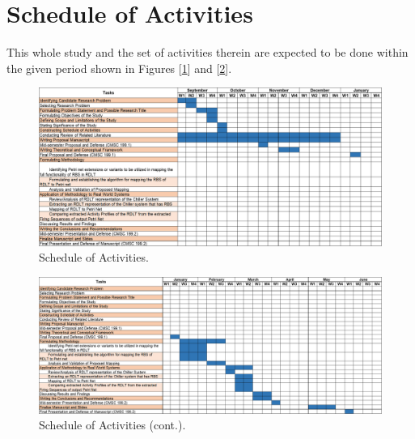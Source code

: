 \section{Schedule of Activities}
This whole study and the set of activities therein are expected to be done within the given period shown in Figures [\ref{schedule}] and [\ref{schedule_cont}].

    \begin{figure}
        \centering
        \includegraphics[scale=0.55]{figures/Schedule of Activities_1_v2.png}
        \caption{Schedule of Activities.}
        \label{schedule}
    \end{figure}
    
    \begin{figure}
        \centering
        \includegraphics[scale=0.55]{figures/Schedule of Activities_2_v2.png}
        \caption{Schedule of Activities (cont.).}
        \label{schedule_cont}
    \end{figure}